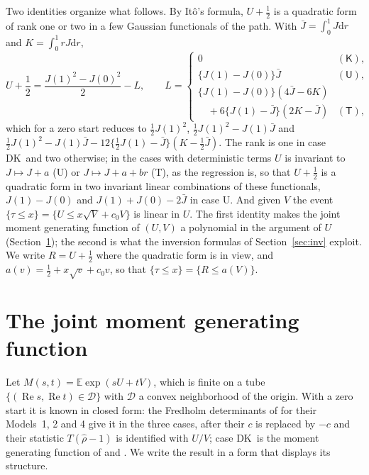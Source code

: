\documentclass[ecta,nameyear,final]{econsocart}
\newcommand{\E}{{\mathbb E}}
\newcommand{\dr}[1]{{\mathrm d}#1}
\newcommand{\Rea}{\operatorname{Re}}
\newcommand{\Fk}{\textsf{\upshape DK}}
\theoremstyle{plain}
\theoremstyle{definition}
\begin{document}
Two identities organize what follows.  By It\^o's formula, $U+\frac12$ is a quadratic form of rank one or two in a few Gaussian functionals of the path.  With $\bar J=\int_0^1J\dr{r}$ and $K=\int_0^1rJ\dr{r}$,
\begin{equation}
U+\frac12=\frac{J(1)^2-J(0)^2}{2}-L,\qquad
L=\begin{cases}
0 & (\textsf{K}),\\
\{J(1)-J(0)\}\bar J & (\textsf{U}),\\
\{J(1)-J(0)\}(4\bar J-6K)\\ \quad+6\{J(1)-\bar J\}(2K-\bar J) & (\textsf{T}),
\end{cases}
\label{eq:U}
\end{equation}
which for a zero start reduces to $\frac12J(1)^2$, $\frac12J(1)^2-J(1)\bar J$ and $\frac12J(1)^2-J(1)\bar J-12\{\frac12J(1)-\bar J\}(K-\frac12\bar J)$.  The rank is one in case \Fk\ and two otherwise; in the cases with deterministic terms $U$ is invariant to $J\mapsto J+a$ (\textsf{U}) or $J\mapsto J+a+br$ (\textsf{T}), as the regression is, so that $U+\frac12$ is a quadratic form in two invariant linear combinations of these functionals, $J(1)-J(0)$ and $J(1)+J(0)-2\bar J$ in case \textsf{U}.  And given $V$ the event $\{\tau\le x\}=\{U\le x\sqrt V+c_0V\}$ is linear in $U$.  The first identity makes the joint moment generating function of $(U,V)$ a polynomial in the argument of $U$ (Section~\ref{sec:mgf}); the second is what the inversion formulas of Section~\ref{sec:inv} exploit.  We write $R=U+\frac12$ where the quadratic form is in view, and $a(v)=\frac12+x\sqrt v+c_0v$, so that $\{\tau\le x\}=\{R\le a(V)\}$.

\section{The joint moment generating function}
\label{sec:mgf}

Let $M(s,t)=\E\exp(sU+tV)$, which is finite on a tube $\{(\Rea s,\Rea t)\in\mathcal{D}\}$ with $\mathcal{D}$ a convex neighborhood of the origin.  With a zero start it is known in closed form: the Fredholm determinants of \citet[Theorem~4]{NabeyaTanaka1990} for their Models~1, 2 and 4 give it in the three cases, after their $c$ is replaced by $-c$ and their statistic $T(\hat\rho-1)$ is identified with $U/V$; case \Fk\ is the moment generating function of \cite{White1958} and \cite{Phillips1987}.  We write the result in a form that displays its structure.
\end{document}
